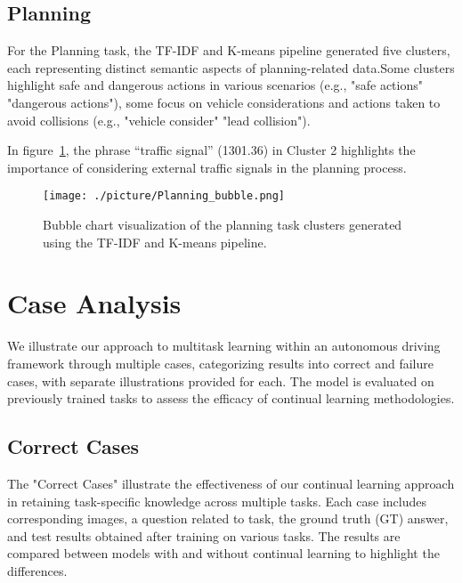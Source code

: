 \subsection{Planning}
For the Planning task, the TF-IDF and K-means pipeline generated five clusters, each representing distinct semantic aspects of planning-related data.Some clusters highlight safe and dangerous actions in various scenarios (e.g., "safe actions" "dangerous actions"), some focus on vehicle considerations and actions taken to avoid collisions (e.g., "vehicle consider" "lead collision").


In figure~\ref{Planning_bubble}, the phrase “traffic signal” (1301.36) in Cluster 2 highlights the importance of considering external traffic signals in the planning process. 

\begin{figure}
    \centering
    \texttt{[image: ./picture/Planning\_bubble.png]}
    \caption{Bubble chart visualization of the planning task clusters generated using the TF-IDF and K-means pipeline.}
    \label{Planning_bubble}
\end{figure}













\section{Case Analysis}
\label{sec: Case Analysis}
We illustrate our approach to multitask learning within an autonomous driving framework through multiple cases, categorizing results into correct and failure cases, with separate illustrations provided for each. The model is evaluated on previously trained tasks to assess the efficacy of continual learning methodologies.

\subsection{Correct Cases} 
The "Correct Cases" illustrate the effectiveness of our continual learning approach in retaining task-specific knowledge across multiple tasks. Each case includes corresponding images, a question related to task, the ground truth (GT) answer, and test results obtained after training on various tasks. The results are compared between models with and without continual learning to highlight the differences.

